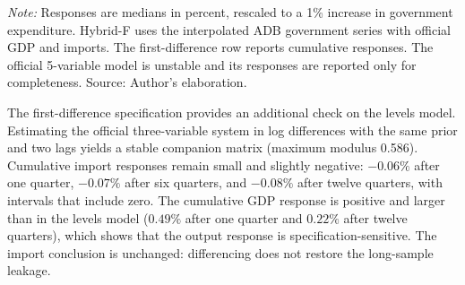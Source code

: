 \documentclass[11pt,a4paper]{article}
\begin{document}
\begin{table}[htbp]
\centering
\small
\caption{Robustness: stability and selected responses}
\label{tab:robustness}
\par\vspace{0.3em}
\begin{minipage}{0.95\textwidth}
\footnotesize\textit{Note:} Responses are medians in percent, rescaled to a 1\% increase in government expenditure. Hybrid-F uses the interpolated ADB government series with official GDP and imports. The first-difference row reports cumulative responses. The official 5-variable model is unstable and its responses are reported only for completeness. Source: Author's elaboration.
\end{minipage}
\end{table}

The first-difference specification provides an additional check on the levels model. Estimating the official three-variable system in log differences with the same prior and two lags yields a stable companion matrix (maximum modulus 0.586). Cumulative import responses remain small and slightly negative: $-0.06\%$ after one quarter, $-0.07\%$ after six quarters, and $-0.08\%$ after twelve quarters, with intervals that include zero. The cumulative GDP response is positive and larger than in the levels model ($0.49\%$ after one quarter and $0.22\%$ after twelve quarters), which shows that the output response is specification-sensitive. The import conclusion is unchanged: differencing does not restore the long-sample leakage.
\end{document}
